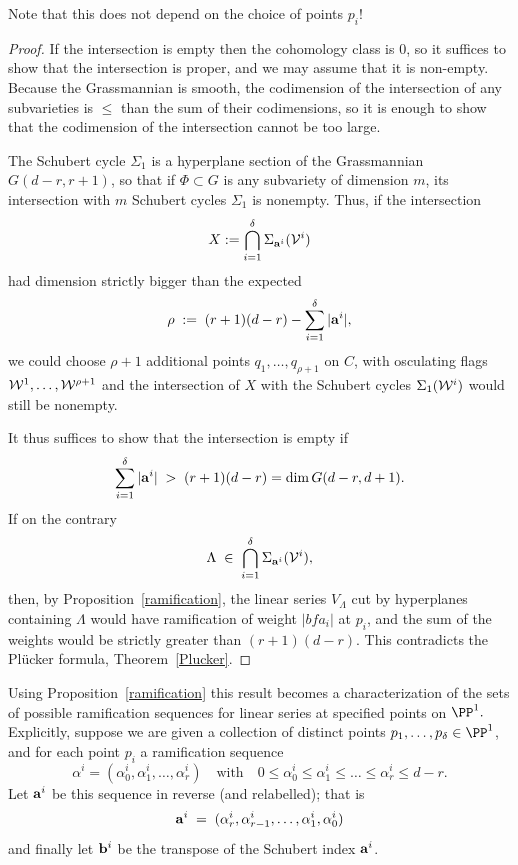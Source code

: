 Note that this does not depend on the choice of points $p_i$!

\begin{proof} 
If the intersection is empty then the cohomology class is 0, so it suffices to show that the intersection is proper,
and we may assume that it is non-empty. Because the Grassmannian is smooth, the codimension of the intersection of any subvarieties
 is $\leq$ than the sum of their codimensions, so it is enough to show that the codimension of the
 intersection cannot be too large.

The Schubert cycle $\Sigma_1$ is a hyperplane section of the Grassmannian $G(d-r, r+1)$, so that if $\Phi \subset G$ is any subvariety of dimension $m$, its intersection with $m$ Schubert cycles $\Sigma_1$ is nonempty. Thus, if the intersection
$$
X := \bigcap_{i=1}^\delta \Sigma_{{\bf a}^i}({\cal V}^i)
$$
had dimension strictly bigger than the expected
$$
\rho \; := \; (r+1)(d-r) - \sum_{i=1}^\delta |{\bf a}^i|,
$$
we could choose $\rho + 1$ additional points $q_1,\dots,q_{\rho + 1}$ on $C$, with osculating flags ${\cal W}^1, \dots, {\cal W}^{\rho + 1}$ and the intersection of $X$ with the Schubert cycles $\Sigma_1({\cal W}^i)$ would still be nonempty.

It thus suffices to show that the intersection is empty if
$$
\sum_{i=1}^\delta |{\bf a}^i| \; > \; (r+1)(d-r) = \dim G(d-r, d+1).
$$
If on the contrary 
$$
\Lambda \; \in \; \bigcap_{i=1}^\delta \Sigma_{{\bf a}^i}({\cal V}^i),
$$
then, by Proposition~\ref{ramification}, the linear series $V_\Lambda$ cut by hyperplanes containing $\Lambda$ would have
ramification of weight $|{bf a_i}|$ at $p_i$, and the sum of the weights would be strictly greater than $(r+1)(d-r)$. 
This contradicts the Pl\"ucker formula, Theorem~\ref{Plucker}.
\end{proof}

Using Proposition~\ref{ramification} this result becomes a characterization of the sets of possible ramification
sequences for linear series at specified points on $\PP^1.$
 Explicitly, suppose we are given a collection of distinct points $p_1,\dots,p_\delta \in \PP^1$, and for each point $p_i$ a ramification sequence
$$
\alpha^i = (\alpha^i_0, \alpha^i_1, \dots, \alpha^i_r) \quad \text{with} \quad 0 \leq \alpha^i_0 \leq \alpha^i_1 \leq \dots \leq \alpha^i_r \leq d-r.
$$
Let ${\bf a}^i$ be this sequence in reverse (and relabelled); that is
$$
{\bf a}^i \; = \; (\alpha^i_r, \alpha^i_{r-1}, \dots, \alpha^i_1, \alpha^i_0)
$$
and finally let ${\bf b}^i$ be the transpose of the Schubert index ${\bf a}^i$. 

